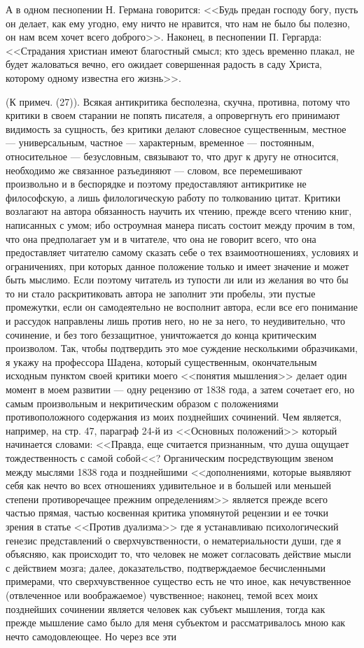 \documentclass[12pt]{article}
\begin{document}
А в одном песнопении Н. Германа говорится: <<Будь предан господу богу, пусть он делает, как ему угодно, ему ничто не нравится, что нам не было бы полезно, он нам всем хочет всего доброго>>. Наконец, в песнопении П. Гергарда: <<Страдания христиан имеют благостный смысл; кто здесь временно плакал, не будет жаловаться вечно, его ожидает совершенная радость в саду Христа, которому одному известна его жизнь>>. 

(К примеч. (27)). Всякая антикритика бесполезна, скучна, противна, потому что критики в своем старании не попять писателя, а опровергнуть его принимают видимость за сущность, без критики делают словесное существенным, местное --- универсальным, частное --- характерным, временное --- постоянным, относительное --- безусловным, связывают то, что друг к другу не относится, необходимо же связанное разъединяют --- словом, все перемешивают произвольно и в беспорядке и поэтому предоставляют антикритике не философскую, а лишь филологическую работу по толкованию цитат. Критики возлагают на автора обязанность научить их чтению, прежде всего чтению книг, написанных с умом; ибо остроумная манера писать состоит между прочим в том, что она предполагает ум и в читателе, что она не говорит всего, что она предоставляет читателю самому сказать себе о тех взаимоотношениях, условиях и ограничениях, при которых данное положение только и имеет значение и может быть мыслимо. Если поэтому читатель из тупости ли или из желания во что бы то ни стало раскритиковать автора не заполнит эти пробелы, эти пустые промежутки, если он самодеятельно не восполнит автора, если все его понимание и рассудок направлены лишь против него, но не за него, то неудивительно, что сочинение, и без того беззащитное, уничтожается до конца критическим произволом. Так, чтобы подтвердить это мое суждение несколькими образчиками, я укажу на профессора Шадена, который существенным, окончательным исходным пунктом своей критики моего <<понятия мышления>> делает один момент в моем развитии --- одну рецензию от 1838 года, а затем сочетает его, но самым произвольным и некритическим образом с положениями противоположного содержания из моих позднейших сочинений. Чем является, например, на стр. 47, параграф 24-й из <<Основных положений>>  который начинается словами: <<Правда, еще считается признанным, что душа ощущает тождественность с самой собой<<? Органическим посредствующим звеном между мыслями 1838 года и позднейшими <<дополнениями, которые выявляют себя как нечто во всех отношениях удивительное и в большей или меньшей степени противоречащее прежним определениям>>  является прежде всего частью прямая, частью косвенная критика упомянутой рецензии и ее точки зрения в статье <<Против дуализма>>  где я устанавливаю психологический генезис представлений о сверхчувственности, о нематериальности души, где я объясняю, как происходит то, что человек не может согласовать действие мысли с действием мозга; далее, доказательство, подтверждаемое бесчисленными примерами, что сверхчувственное существо есть не что иное, как нечувственное (отвлеченное или воображаемое) чувственное; наконец, темой всех моих позднейших сочинении является человек как субъект мышления, тогда как прежде мышление само было для меня субъектом и рассматривалось мною как нечто самодовлеющее. Но через все эти 
\end{document}
